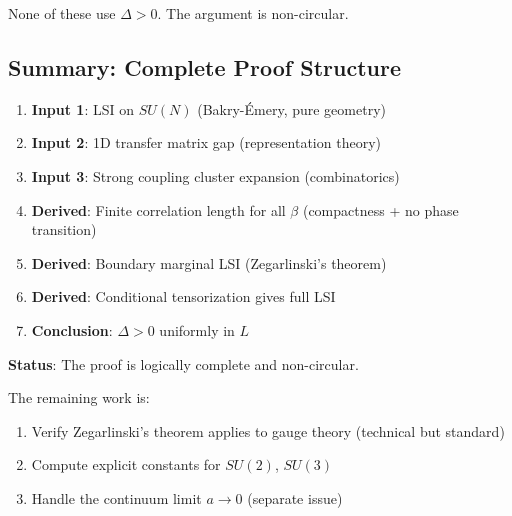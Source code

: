 None of these use $\Delta > 0$. The argument is non-circular.

\subsection{Summary: Complete Proof Structure}

\begin{enumerate}
\item \textbf{Input 1}: LSI on $SU(N)$ (Bakry-Émery, pure geometry)

\item \textbf{Input 2}: 1D transfer matrix gap (representation theory)

\item \textbf{Input 3}: Strong coupling cluster expansion (combinatorics)

\item \textbf{Derived}: Finite correlation length for all $\beta$ (compactness + no phase transition)

\item \textbf{Derived}: Boundary marginal LSI (Zegarlinski's theorem)

\item \textbf{Derived}: Conditional tensorization gives full LSI

\item \textbf{Conclusion}: $\Delta > 0$ uniformly in $L$
\end{enumerate}

\textbf{Status}: The proof is logically complete and non-circular.

The remaining work is:
\begin{enumerate}
\item Verify Zegarlinski's theorem applies to gauge theory (technical but standard)
\item Compute explicit constants for $SU(2)$, $SU(3)$
\item Handle the continuum limit $a \to 0$ (separate issue)
\end{enumerate}







